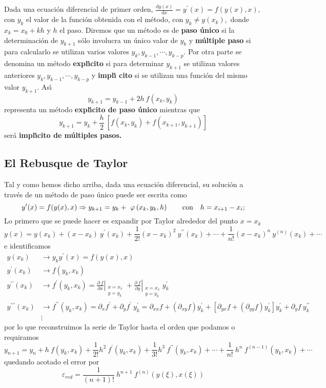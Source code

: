 \documentclass[spanish,titlepage,11pt]{article}
\begin{document}
Dada una ecuaci\'{o}n diferencial de primer orden, $\frac{\mathrm{d}%
y(x)}{\mathrm{d}x}=y^{\prime}(x)=f(y(x),x),$ con $y_{k}$ el valor de la
funci\'{o}n obtenida con el m\'{e}todo, con $y_{k}\neq y(x_{k}),$ donde
$x_{k}=x_{0}+kh$ y $h$ el paso. Diremos que un m\'{e}todo es de \textbf{paso
\'{u}nico} si la determinaci\'{o}n de $y_{k+1}$ s\'{o}lo involucra un
\'{u}nico valor de $y_{k}$ y \textbf{m\'{u}ltiple paso} si para calcularlo se
utilizan varios valores $y_{k},y_{k-1},\cdots,y_{k-p}.$ Por otra parte se
denomina un m\'{e}todo \textbf{expl\'{\i}cito} si para determinar $y_{k+1}$ se
utilizan valores anteriores $y_{k},y_{k-1},\cdots,y_{k-p}$ y \textbf{impl\'{\i
}cito} si se utilizan una funci\'{o}n del mismo valor $y_{k+1}.$ As\'{\i}
\[
y_{k+1}=y_{k-1}+2h\ f\left(  x_{k},y_{k}\right)
\]
representa un m\'{e}todo \textbf{expl\'{\i}cito de paso \'{u}nico} mientras
que
\[
y_{k+1}=y_{k}+\frac{h}{2}\ \left[  f\left(  x_{k},y_{k}\right)  +f\left(
x_{k+1},y_{k+1}\right)  \right]
\]
ser\'{a} \textbf{impl\'{\i}cito de m\'{u}ltiples pasos.}

\subsection{El Rebusque de Taylor}

Tal y como hemos dicho arriba, dada una ecuaci\'{o}n diferencial, su
soluci\'{o}n a trav\'{e}s de un m\'{e}todo de paso \'{u}nico puede ser escrita
como
\[
y^{\prime}(x)=f(y(x),x)\Rightarrow y_{k+1}=y_{k}+\ \varphi\left(  x_{k}%
,y_{k},h\right)  \qquad\text{con\quad}h=x_{i+1}-x_{i};
\]
Lo primero que se puede hacer es expandir por Taylor alrededor del punto
$x=x_{k}$%
\[
y(x)=y(x_{k})+\left(  x-x_{k}\right)  \ y^{\prime}(x_{k})+\frac{1}{2!}\left(
x-x_{k}\right)  ^{2}\ y^{\prime\prime}(x_{k})+\cdots+\frac{1}{n!}\left(
x-x_{k}\right)  ^{n}\ y^{(n)}(x_{k})+\cdots
\]
e identificamos
\begin{align*}
y(x_{k})  &  \rightarrow y_{k}y^{\prime}(x)=f(y(x),x)\\
y^{\prime}(x_{k})  &  \rightarrow f(y_{k},x_{k})\\
y^{\prime\prime}(x_{k})  &  \rightarrow f^{\prime}(y_{k},x_{k})=\left.
\frac{\partial\ f}{\partial x}\right|  _{\substack{x=x_{x} \\y=y_{k}
}}+\left.  \frac{\partial\ f}{\partial y}\right|  _{\substack{x=x_{x}
\\y=y_{k} }}y_{k}^{\prime}\\
y^{\prime\prime\prime}(x_{k})  &  \rightarrow f^{\prime\prime}(y_{k}%
,x_{k})=\partial_{x}f^{\prime}+\partial_{y}f^{\prime}\ y_{k}^{\prime}%
=\partial_{xx}f+\left(  \partial_{xy}f\right)  y_{k}^{\prime}+\left[
\partial_{yx}f+\left(  \partial_{yy}f\right)  y_{k}^{\prime}\right]
y_{k}^{\prime}+\partial_{y}f\ y_{k}^{\prime\prime}\\
&  \vdots
\end{align*}
por lo que reconstruimos la serie de Taylor hasta el orden que podamos o
requiramos
\[
y_{n+1}=y_{n}+h\ f(y_{k},x_{k})+\frac{1}{2!}h^{2}\ f^{\prime}(y_{k}%
,x_{k})+\frac{1}{3!}h^{3}\ f^{\prime\prime}(y_{k},x_{k})+\cdots+\frac{1}%
{n!}\ h^{n}\ f^{(n-1)}(y_{k},x_{k})+\cdots
\]
quedando acotado el error por
\[
\varepsilon_{red}=\frac{1}{\left(  n+1\right)  !}\ h^{n+1}\ f^{(n)}%
(y(\xi),x(\xi))
\]
\end{document}
